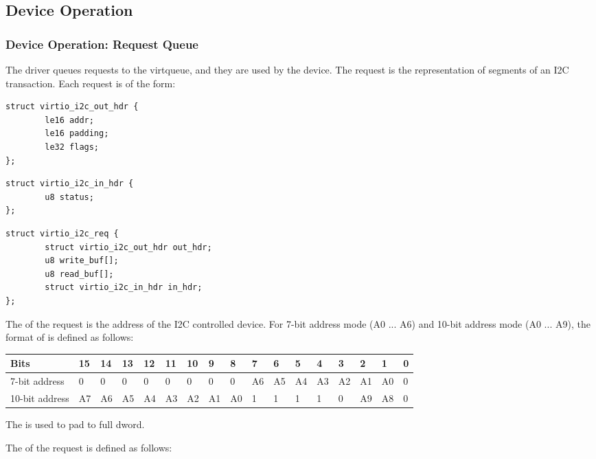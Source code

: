 \subsection{Device Operation}\label{sec:Device Types / I2C Adapter Device / Device Operation}

\subsubsection{Device Operation: Request Queue}\label{sec:Device Types / I2C Adapter Device / Device Operation: Request Queue}

The driver queues requests to the virtqueue, and they are used by the
device. The request is the representation of segments of an I2C
transaction. Each request is of the form:

\begin{lstlisting}
struct virtio_i2c_out_hdr {
        le16 addr;
        le16 padding;
        le32 flags;
};
\end{lstlisting}

\begin{lstlisting}
struct virtio_i2c_in_hdr {
        u8 status;
};
\end{lstlisting}

\begin{lstlisting}
struct virtio_i2c_req {
        struct virtio_i2c_out_hdr out_hdr;
        u8 write_buf[];
        u8 read_buf[];
        struct virtio_i2c_in_hdr in_hdr;
};
\end{lstlisting}

The  of the request is the address of the I2C controlled device.
For 7-bit address mode (A0 ... A6) and 10-bit address mode (A0 ... A9),
the format of  is defined as follows:

\begin{tabular}{ |l||l|l|l|l|l|l|l|l|l|l|l|l|l|l|l|l| }
\hline
Bits           & 15 & 14 & 13 & 12 & 11 & 10 & 9  & 8  & 7  & 6  & 5  & 4  & 3  & 2  & 1  & 0 \\
\hline
7-bit address  & 0  & 0  & 0  & 0  & 0  & 0  & 0  & 0  & A6 & A5 & A4 & A3 & A2 & A1 & A0 & 0 \\
\hline
10-bit address & A7 & A6 & A5 & A4 & A3 & A2 & A1 & A0 & 1  & 1  & 1  & 1  & 0  & A9 & A8 & 0 \\
\hline
\end{tabular}

The  is used to pad to full dword.

The  of the request is defined as follows:

